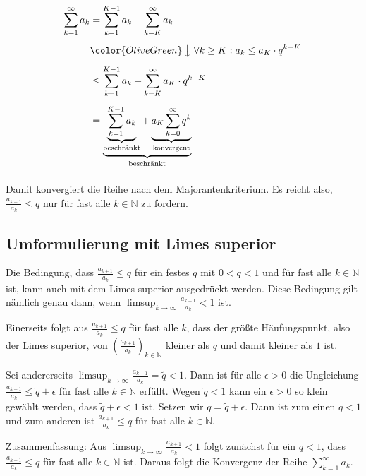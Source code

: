 \documentclass[fontsize=9pt,
               parskip=half-,
               DIV=14,
               listof=chapterentry,
               tocflat]{scrbook}
\begin{document}
\begin{align*}
\sum _{k=1}^{\infty }a_{k}&=\sum _{k=1}^{K-1}a_{k}+\sum _{k=K}^{\infty }a_{k}\\[0.5em]&{\color {OliveGreen}\left\downarrow \ \forall k\geq K:a_{k}\leq a_{K}\cdot q^{k-K}\right.}\\[0.5em]&\leq \sum _{k=1}^{K-1}a_{k}+\sum _{k=K}^{\infty }a_{K}\cdot q^{k-K}\\[0.5em]&=\underbrace {\underbrace {\sum _{k=1}^{K-1}a_{k}} _{\text{beschränkt}}+\underbrace {a_{K}\sum _{k=0}^{\infty }q^{k}} _{\text{konvergent}}} _{\text{beschränkt}}\\[0.5em]
\end{align*}

Damit konvergiert die Reihe nach dem Majorantenkriterium. Es reicht also, ${\tfrac {a_{k+1}}{a_{k}}}\leq q$ nur für fast alle $k\in \mathbb {N} $ zu fordern.

\subsection{Umformulierung mit Limes superior}

Die Bedingung, dass ${\tfrac {a_{k+1}}{a_{k}}}\leq q$ für ein festes $q$ mit $0<q<1$ und für fast alle $k\in \mathbb {N} $ ist, kann auch mit dem Limes superior ausgedrückt werden. Diese Bedingung gilt nämlich genau dann, wenn $\limsup _{k\to \infty }{\tfrac {a_{k+1}}{a_{k}}}<1$ ist.

Einerseits folgt aus ${\tfrac {a_{k+1}}{a_{k}}}\leq q$ für fast alle $k$, dass der größte Häufungspunkt, also der Limes superior, von $\left({\tfrac {a_{k+1}}{a_{k}}}\right)_{k\in \mathbb {N} }$ kleiner als $q$ und damit kleiner als $1$ ist.

Sei andererseits $\limsup _{k\to \infty }{\tfrac {a_{k+1}}{a_{k}}}={\tilde {q}}<1$. Dann ist für alle $\epsilon >0$ die Ungleichung ${\tfrac {a_{k+1}}{a_{k}}}\leq {\tilde {q}}+\epsilon $ für fast alle $k\in \mathbb {N} $ erfüllt. Wegen ${\tilde {q}}<1$ kann ein $\epsilon >0$ so klein gewählt werden, dass ${\tilde {q}}+\epsilon <1$ ist. Setzen wir $q={\tilde {q}}+\epsilon $. Dann ist zum einen $q<1$ und zum anderen ist ${\tfrac {a_{k+1}}{a_{k}}}\leq q$ für fast alle $k\in \mathbb {N} $.

Zusammenfassung: Aus $\limsup _{k\to \infty }{\tfrac {a_{k+1}}{a_{k}}}<1$ folgt zunächst für ein $q<1$, dass ${\tfrac {a_{k+1}}{a_{k}}}\leq q$ für fast alle $k\in \mathbb {N} $ ist. Daraus folgt die Konvergenz der Reihe $\sum _{k=1}^{\infty }a_{k}$.
\end{document}
